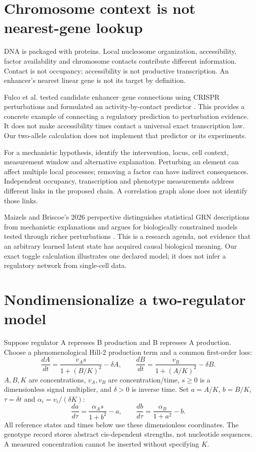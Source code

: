 \section{Chromosome context is not nearest-gene lookup}
DNA is packaged with proteins. Local nucleosome organization, accessibility,
factor availability and chromosome contacts contribute different information.
Contact is not occupancy; accessibility is not productive transcription.
An enhancer's nearest linear gene is not its target by definition.

Fulco et al. tested candidate enhancer--gene connections using CRISPR
perturbations and formulated an activity-by-contact predictor
\cite{Fulco2019}. This provides a concrete example of connecting a regulatory
prediction to perturbation evidence. It does not make accessibility times contact
a universal exact transcription law. Our two-allele calculation does not implement
that predictor or its experiments.

For a mechanistic hypothesis, identify the intervention, locus, cell context,
measurement window and alternative explanation. Perturbing an element can affect
multiple local processes; removing a factor can have indirect consequences.
Independent occupancy, transcription and phenotype measurements address
different links in the proposed chain. A correlation graph alone does not
identify those links.

Maizels and Briscoe's 2026 perspective distinguishes statistical GRN descriptions
from mechanistic explanations and argues for biologically constrained models
tested through richer perturbations \cite{MaizelsBriscoe2026}.
This is a research agenda, not evidence that an arbitrary learned latent state
has acquired causal biological meaning. Our exact toggle calculation illustrates
one declared model; it does not infer a regulatory network from single-cell data.

\section{Nondimensionalize a two-regulator model}
Suppose regulator A represses B production and B represses A production.
Choose a phenomenological Hill-$2$ production term and a common first-order loss:
\[
 \frac{dA}{dt}=\frac{v_A s}{1+(B/K)^2}-\delta A,\qquad
 \frac{dB}{dt}=\frac{v_B}{1+(A/K)^2}-\delta B.
\]
$A,B,K$ are concentrations, $v_A,v_B$ are concentration/time, $s\ge0$ is a
dimensionless signal multiplier, and $\delta>0$ is inverse time.
Set $a=A/K$, $b=B/K$, $\tau=\delta t$ and
$\alpha_i=v_i/(\delta K)$:
\[
 \frac{da}{d\tau}=\frac{\alpha_A s}{1+b^2}-a,\qquad
 \frac{db}{d\tau}=\frac{\alpha_B}{1+a^2}-b.
\]
All reference states and times below use these dimensionless coordinates.
The genotype record stores abstract cis-dependent strengths, not nucleotide
sequences. A measured concentration cannot be inserted without specifying $K$.

